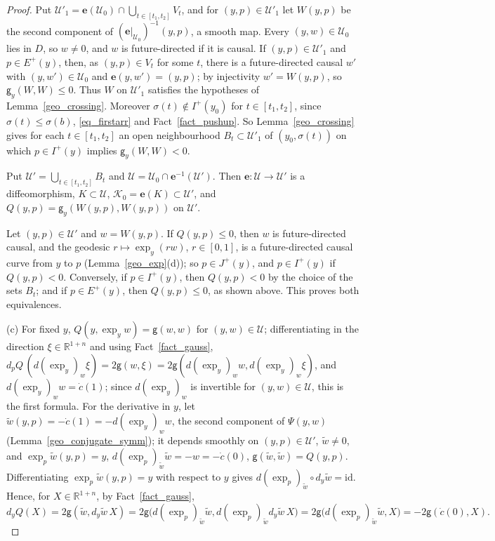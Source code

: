\documentclass[11pt,a4paper,reqno]{amsart}
\theoremstyle{definition}
\numberwithin{equation}{section}
\newcommand{\R}{\mathbb{R}}
\newcommand{\cE}{\mathbf{e}}
\newcommand{\cK}{\mathcal{K}}
\newcommand{\cU}{\mathcal{U}}
\newcommand{\sg}{\mathsf{g}}
\newcommand{\id}{\mathrm{id}}
\newcommand{\Ehor}{E}
\begin{document}
\begin{proof}
Put $\cU'_1=\cE(\cU_0)\cap\bigcup_{t\in[t_1,t_2]}V_t$, and for $(y,p)\in\cU'_1$ let $W(y,p)$ be the second component of
$(\cE|_{\cU_0})^{-1}(y,p)$, a smooth map. Every $(y,w)\in\cU_0$ lies in $D$, so $w\ne0$, and $w$ is future-directed if it is
causal. If $(y,p)\in\cU'_1$ and $p\in\Ehor^+(y)$, then, as $(y,p)\in V_t$ for some $t$, there is a future-directed causal
$w'$ with $(y,w')\in\cU_0$ and $\cE(y,w')=(y,p)$; by injectivity $w'=W(y,p)$, so $\sg_y(W,W)\le0$. Thus $W$ on $\cU'_1$
satisfies the hypotheses of Lemma~\ref{geo_crossing}. Moreover $\sigma(t)\notin I^+(y_0)$ for $t\in[t_1,t_2]$, since
$\sigma(t)\le\sigma(b)$, \eqref{eq_firstarr} and Fact~\ref{fact_pushup}. So Lemma~\ref{geo_crossing} gives for each $t\in[t_1,t_2]$ an open
neighbourhood $B_t\subset\cU'_1$ of $(y_0,\sigma(t))$ on which $p\in I^+(y)$ implies $\sg_y(W,W)<0$.

Put $\cU'=\bigcup_{t\in[t_1,t_2]}B_t$ and $\cU=\cU_0\cap\cE^{-1}(\cU')$. Then
$\cE\colon\cU\to\cU'$ is a diffeomorphism, $K\subset\cU$, $\cK_0=\cE(K)\subset\cU'$, and $Q(y,p)=\sg_y(W(y,p),W(y,p))$ on
$\cU'$.

Let $(y,p)\in\cU'$ and $w=W(y,p)$. If $Q(y,p)\le0$, then $w$ is future-directed causal, and the geodesic
$r\mapsto\exp_y(rw)$, $r\in[0,1]$, is a future-directed causal curve from $y$ to $p$ (Lemma~\ref{geo_exp}(d)); so
$p\in J^+(y)$, and $p\in I^+(y)$ if $Q(y,p)<0$. Conversely, if $p\in I^+(y)$, then $Q(y,p)<0$ by the choice of the sets
$B_t$; and if $p\in\Ehor^+(y)$, then $Q(y,p)\le0$, as shown above. This proves both equivalences.

(c) For fixed $y$, $Q(y,\exp_yw)=\sg(w,w)$ for $(y,w)\in\cU$; differentiating in the direction $\xi\in\R^{1+n}$ and using
Fact~\ref{fact_gauss}, $d_pQ\,(d(\exp_y)_w\xi)=2\sg(w,\xi)=2\sg(d(\exp_y)_w w,d(\exp_y)_w\xi)$, and
$d(\exp_y)_ww=\dot c(1)$; since $d(\exp_y)_w$ is invertible for $(y,w)\in\cU$, this is the first formula. For the derivative in
$y$, let $\tilde w(y,p)=-\dot c(1)=-d(\exp_y)_ww$, the second component of $\Psi(y,w)$ (Lemma~\ref{geo_conjugate_symm}); it
depends smoothly on $(y,p)\in\cU'$, $\tilde w\ne0$, and $\exp_p\tilde w(y,p)=y$, $d(\exp_p)_{\tilde w}\tilde w=-w=-\dot c(0)$,
$\sg(\tilde w,\tilde w)=Q(y,p)$. Differentiating $\exp_p\tilde w(y,p)=y$ with respect to $y$ gives
$d(\exp_p)_{\tilde w}\circ d_y\tilde w=\id$. Hence, for $X\in\R^{1+n}$, by Fact~\ref{fact_gauss},
\[
d_yQ(X)=2\sg(\tilde w,d_y\tilde w\,X)=2\sg\bigl(d(\exp_p)_{\tilde w}\tilde w,d(\exp_p)_{\tilde w}d_y\tilde w\,X\bigr)
=2\sg\bigl(d(\exp_p)_{\tilde w}\tilde w,X\bigr)=-2\sg(\dot c(0),X).
\]
\end{proof}
\end{document}
